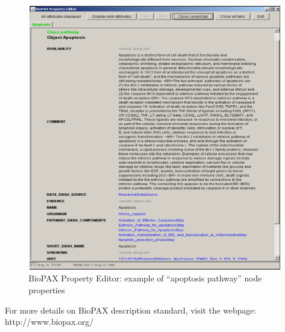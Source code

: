 \begin{figure}[h]
\centering
\includegraphics[width=18 cm]{graphics/BioPAX_Property_Editor_apoptosis}
\caption{BioPAX Property Editor: example of “apoptosis pathway” node properties}
\label{BioPAX_Property_Editor_apoptosis}
\end{figure}	
For more details on BioPAX description standard, visit the webpage: http://www.biopax.org/ 
